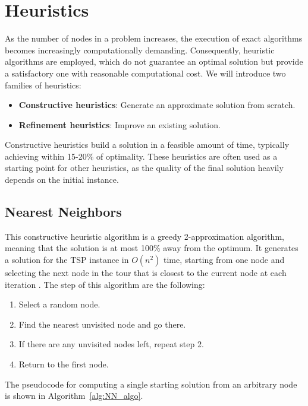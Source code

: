 \chapter{Heuristics}
As the number of nodes in a problem increases, the execution of exact algorithms becomes increasingly computationally demanding. Consequently, heuristic algorithms are employed, which do not guarantee an optimal solution but provide a satisfactory one with reasonable computational cost. We will introduce two families of heuristics:

\begin{itemize}
    \item \textbf{Constructive heuristics}: Generate an approximate solution from scratch.
    \item \textbf{Refinement heuristics}: Improve an existing solution.
\end{itemize}

Constructive heuristics build a solution in a feasible amount of time, typically achieving within 15-20\% of optimality. These heuristics are often used as a starting point for other heuristics, as the quality of the final solution heavily depends on the initial instance.

\section{Nearest Neighbors}
This constructive heuristic algorithm is a greedy 2-approximation algorithm, meaning that the solution is at most 100\% away from the optimum. It generates a solution for the TSP instance in \(O(n^2)\) time, starting from one node and selecting the next node in the tour that is closest to the current node at each iteration \cite{article} \cite{inproceedings}. The step of this algorithm are the following:

\begin{enumerate}
    \item Select a random node.
    \item Find the nearest unvisited node and go there.
    \item If there are any unvisited nodes left, repeat step 2.
    \item Return to the first node.
\end{enumerate}

The pseudocode for computing a single starting solution from an arbitrary node is shown in Algorithm~\ref{alg:NN_algo}.\\


